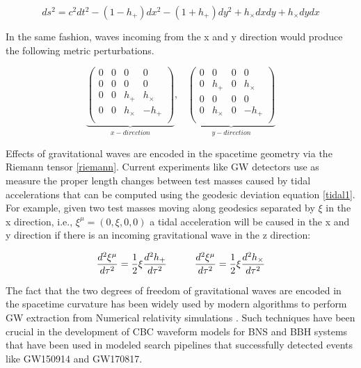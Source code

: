 \begin{equation}\label{GWlineelement}
ds^2 = c^2 dt^2 - (1-h_+) dx^2 - (1+h_+) dy^2 + h_\times dxdy + h_\times dydx
\end{equation}

In the same fashion, waves incoming from the x and y direction would produce the following metric perturbations.

\begin{equation}
\underbrace{\begin{pmatrix}
0&0&0&0 \\
0&0&0&0 \\
0&0&h_+& h_\times \\
0&0&h_\times& - h_+\\
\end{pmatrix}}_{x-direction},\;\;\; 
\underbrace{\begin{pmatrix}
0&0&0&0 \\
0&h_+&0&h_\times \\
0&0&0&0 \\
0&h_\times&0&-h_+ \\
\end{pmatrix}}_{y-direction}
\end{equation}


Effects of gravitational waves are encoded in the spacetime geometry via the Riemann tensor \ref{riemann}. Current experiments like GW detectors use as measure the proper length changes between test masses caused by tidal accelerations that can be computed using the geodesic deviation equation \ref{tidal1}. For example,  given two test masses moving along geodesics separated by $\xi$ in the x direction, i.e., $\xi^\mu = (0,\xi,0,0)$ a tidal acceleration will be caused in the x and y direction if there is an incoming gravitational wave in the z direction:

\begin{equation}
\frac{d^2 \xi^{\mu}}{d\tau^2} = \frac{1}{2}\xi \frac{d^2 h_+}{d\tau^2} \hspace{10mm} \frac{d^2 \xi^{\mu}}{d\tau^2} = \frac{1}{2}\xi \frac{d^2 h_\times}{d\tau^2}
\end{equation}

The fact that the two degrees of freedom of gravitational waves are encoded in the spacetime curvature has been widely used by modern algorithms to perform GW extraction from Numerical relativity simulations \cite{Bishop:2016lgv}. Such techniques have been crucial in the development of CBC waveform models for BNS and BBH systems that have been used in modeled search pipelines that successfully detected events like GW150914\cite{LIGOScientific:2016aoc} and GW170817\cite{LIGOScientific:2017vwq}.
 

